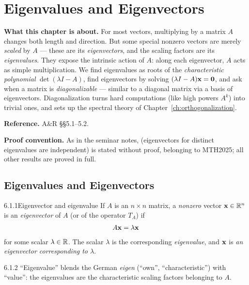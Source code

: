 \chapter{Eigenvalues and Eigenvectors}
\label{ch:eigenvalues}

\begin{roadmap}
\noindent\textbf{What this chapter is about.}\;
For most vectors, multiplying by a matrix $A$ changes both length and direction. But some special nonzero vectors are merely \emph{scaled} by $A$ --- these are its \emph{eigenvectors}, and the scaling factors are its \emph{eigenvalues}. They expose the intrinsic action of $A$: along each eigenvector, $A$ acts as simple multiplication. We find eigenvalues as roots of the \emph{characteristic polynomial} $\det(\lambda I-A)$, find eigenvectors by solving $(\lambda I-A)\mathbf{x}=\mathbf{0}$, and ask when a matrix is \emph{diagonalizable} --- similar to a diagonal matrix via a basis of eigenvectors. Diagonalization turns hard computations (like high powers $A^k$) into trivial ones, and sets up the spectral theory of Chapter~\ref{ch:orthogonalization}.
\medskip

\noindent\textbf{Reference.}\; A\&R \S\S5.1--5.2.

\noindent\textbf{Proof convention.}\; As in the seminar notes,  (eigenvectors for distinct eigenvalues are independent) is stated without proof, belonging to MTH2025; all other results are proved in full.
\end{roadmap}

\section{Eigenvalues and Eigenvectors}
\label{sec:6.1}

\begin{defns}{6.1.1}{Eigenvector and eigenvalue}
If $A$ is an $n\times n$ matrix, a \emph{nonzero} vector $\mathbf{x}\in\mathbb{R}^n$ is an \emph{eigenvector} of $A$ (or of the operator $T_A$) if
\[
A\mathbf{x}=\lambda\mathbf{x}
\]
for some scalar $\lambda\in\mathbb{R}$. The scalar $\lambda$ is the corresponding \emph{eigenvalue}, and $\mathbf{x}$ is \emph{an eigenvector corresponding to $\lambda$}.
\end{defns}

\begin{rmks}{6.1.2}
``Eigenvalue'' blends the German \emph{eigen} (``own'', ``characteristic'') with ``value'': the eigenvalues are the characteristic scaling factors belonging to $A$.
\end{rmks}

